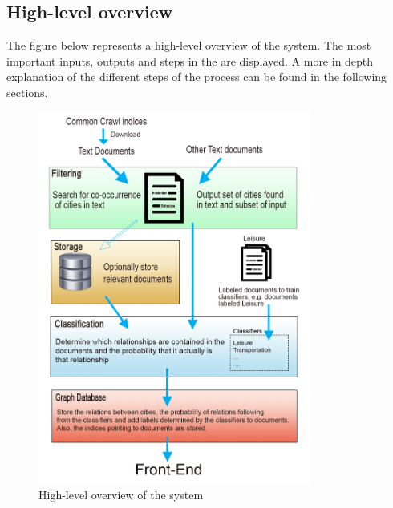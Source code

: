 \subsection{High-level overview}
The figure below represents a high-level overview of the system. The most important inputs, outputs and steps in the are displayed. A more in depth explanation of the different steps of the process can be found in the following sections.
\begin{figure}[h]
\centering
\includegraphics[width=0.8\textwidth]{System-overview-3}
\caption{High-level overview of the system}
\label{fig:overview}
\end{figure}